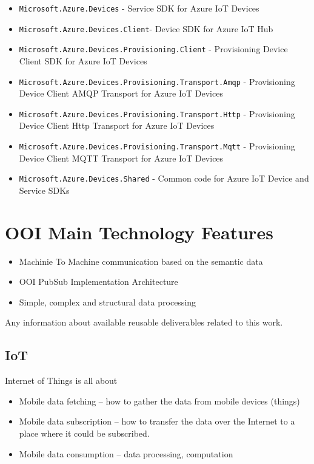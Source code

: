 \documentclass[
]{article}
\providecommand{\tightlist}{%
  \setlength{\itemsep}{0pt}\setlength{\parskip}{0pt}}
\begin{document}
\begin{itemize}
\tightlist
\item
  \texttt{Microsoft.Azure.Devices} - Service SDK for Azure IoT Devices
\item
  \texttt{Microsoft.Azure.Devices.Client}- Device SDK for Azure IoT Hub
\item
  \texttt{Microsoft.Azure.Devices.Provisioning.Client} - Provisioning
  Device Client SDK for Azure IoT Devices
\item
  \texttt{Microsoft.Azure.Devices.Provisioning.Transport.Amqp} -
  Provisioning Device Client AMQP Transport for Azure IoT Devices
\item
  \texttt{Microsoft.Azure.Devices.Provisioning.Transport.Http} -
  Provisioning Device Client Http Transport for Azure IoT Devices
\item
  \texttt{Microsoft.Azure.Devices.Provisioning.Transport.Mqtt} -
  Provisioning Device Client MQTT Transport for Azure IoT Devices
\item
  \texttt{Microsoft.Azure.Devices.Shared} - Common code for Azure IoT
  Device and Service SDKs
\end{itemize}

\hypertarget{ooi-main-technology-features}{%
\section{OOI Main Technology
Features}\label{ooi-main-technology-features}}

\begin{itemize}
\tightlist
\item
  Machinie To Machine communication based on the semantic data
\item
  OOI PubSub Implementation Architecture
\item
  Simple, complex and structural data processing
\end{itemize}

Any information about available reusable deliverables related to this
work.

\hypertarget{iot}{%
\subsection{IoT}\label{iot}}

Internet of Things is all about

\begin{itemize}
\tightlist
\item
  Mobile data fetching -- how to gather the data from mobile devices
  (things)
\item
  Mobile data subscription -- how to transfer the data over the Internet
  to a place where it could be subscribed.
\item
  Mobile data consumption -- data processing, computation
\end{itemize}
\end{document}
